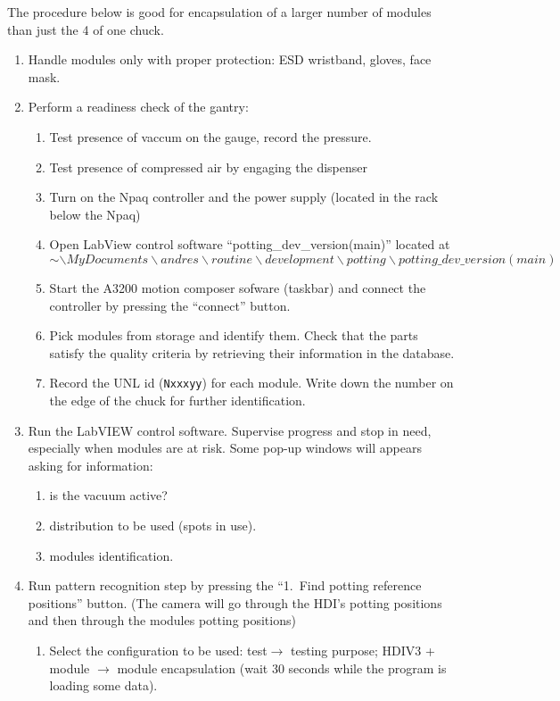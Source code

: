 \documentclass[12pt]{unlsilabsop}
\begin{document}
The procedure below is good for encapsulation of a larger number of modules than just the 4 of one chuck.
\begin{enumerate}
    \item Handle modules only with proper protection: ESD wristband, gloves, face mask.
    \item Perform a readiness check of the gantry:
    \begin{enumerate}
	\item Test presence of vaccum on the gauge, record the pressure.
	\item Test presence of compressed air by engaging the dispenser
        \item Turn on the Npaq controller and the power supply (located in the rack below the Npaq)
        \item Open LabView control software ``potting\_dev\_version(main)'' located at $$ \sim\backslash MyDocuments\backslash andres\backslash routine\backslash development\backslash potting \backslash potting\_dev\_version(main)$$
        \item Start the A3200 motion composer sofware (taskbar) and connect the controller by pressing the ``connect'' button.
       \item Pick modules from storage and identify them. Check that the parts satisfy the quality criteria by retrieving their information in the database. \label{enum:startenacpulation}
    \item Record the UNL id (\texttt{Nxxxyy}) for each module. Write down the number on the edge of the chuck for further identification.
    \end{enumerate}
  \item Run the LabVIEW control software. Supervise progress and stop in need, especially when modules are at risk. Some pop-up windows will appears asking for information:
    \begin{enumerate}
    \item is the vacuum active?
    \item distribution to be used (spots in use).  
    \item modules identification.  
    \end{enumerate}
  \item Run pattern recognition step by pressing the ``1.~Find potting reference positions'' button. (The camera will go through the HDI's potting positions and then through the modules potting positions)
    \begin{enumerate}
    \item Select the configuration to be used: test$\to$ testing purpose; HDIV3 + module $\to$ module encapsulation (wait 30 seconds while the program is loading some data). 

\end{enumerate}
\end{enumerate}
\end{document}
